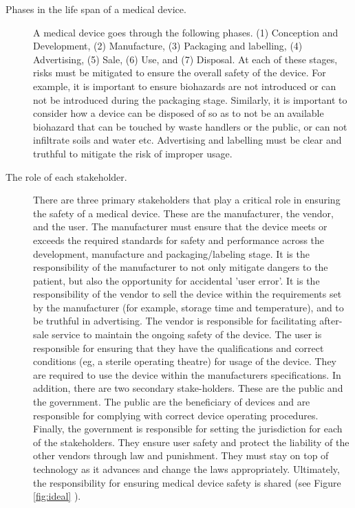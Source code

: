 \documentclass[12pt, openany, oneside]{book}
\begin{document}
\begin{description}
	\item[Phases in the life span of a medical device.] A medical device goes through the following phases. (1) Conception and Development, (2) Manufacture, (3) Packaging and labelling, (4) Advertising, (5) Sale, (6) Use, and (7) Disposal. At each of these stages, risks must be mitigated to ensure the overall safety of the device. For example, it is important to ensure biohazards are not introduced or can not be introduced during the packaging stage. Similarly, it is important to consider how a device can be disposed of so as to not be an available biohazard that can be touched by waste handlers or the public, or can not infiltrate soils and water etc. Advertising and labelling must be clear and truthful to mitigate the risk of improper usage. 	
	\item[The role of each stakeholder.] There are three primary stakeholders that play a critical role in ensuring the safety of a medical device. These are the manufacturer, the vendor, and the user. The manufacturer must ensure that the device meets or exceeds the required standards for safety and performance across the development, manufacture and packaging/labeling stage.  It is the responsibility of the manufacturer to not only mitigate dangers to the patient, but also the opportunity for accidental 'user error'. It is the responsibility of the vendor to sell the device within the requirements set by the manufacturer (for example, storage time and temperature), and to be truthful in advertising. The vendor is responsible for facilitating after-sale service to maintain the ongoing safety of the device. The user is responsible for ensuring that they have the qualifications and correct conditions (eg, a sterile operating theatre) for usage of the device. They are required to use the device within the manufacturers specifications. 
In addition, there are two secondary stake-holders. These are the public and the government. The public are the beneficiary of devices and are responsible for complying with correct device operating procedures. Finally, the government is responsible for setting the jurisdiction for each of the stakeholders. They ensure user safety and protect the liability of the other vendors through law and punishment. They must stay on top of technology as it advances and change the laws appropriately. Ultimately, the responsibility for ensuring medical device safety is shared (see Figure \ref{fig:ideal}  \citep{cheng2003}).

\end{description}
\end{document}

